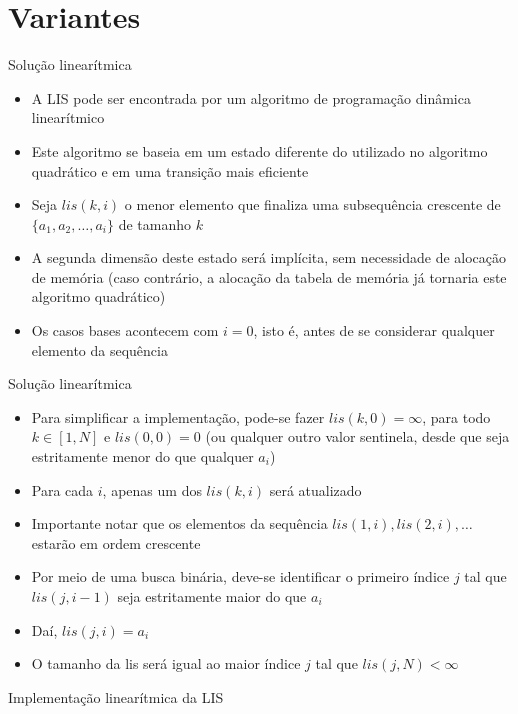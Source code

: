 \section{Variantes}

\begin{frame}[fragile]{Solução linearítmica}

    \begin{itemize}
        \item A LIS pode ser encontrada por um algoritmo de programação dinâmica linearítmico

        \item Este algoritmo se baseia em um estado diferente do utilizado no algoritmo
            quadrático e em uma transição mais eficiente

        \item Seja $lis(k, i)$ o menor elemento que finaliza uma subsequência crescente de
            $\{ a_1, a_2, \ldots, a_i \}$ de tamanho $k$

        \item A segunda dimensão deste estado será implícita, sem necessidade de alocação de
            memória (caso contrário, a alocação da tabela de memória já tornaria este 
            algoritmo quadrático)

        \item Os casos bases acontecem com $i = 0$, isto é, antes de se considerar qualquer
            elemento da sequência

    \end{itemize}

\end{frame}

\begin{frame}[fragile]{Solução linearítmica}

    \begin{itemize}
        \item Para simplificar a implementação, pode-se fazer $lis(k, 0) = \infty$, para 
            todo $k\in [1, N]$ e $lis(0, 0) = 0$ (ou qualquer outro valor sentinela, desde
            que seja estritamente menor do que qualquer $a_i$)

        \item Para cada $i$, apenas um dos $lis(k, i)$ será atualizado

        \item Importante notar que os elementos da sequência $lis(1, i), lis(2, i), \ldots$
            estarão em ordem crescente

        \item Por meio de uma busca binária, deve-se identificar o primeiro índice $j$ tal que
            $lis(j, i - 1)$ seja estritamente maior do que $a_i$

        \item Daí, $lis(j, i) = a_i$

        \item O tamanho da lis será igual ao maior índice $j$ tal que $lis(j, N) < \infty$
    \end{itemize}

\end{frame}



\begin{frame}[fragile]{Implementação linearítmica da LIS}
\end{frame}
